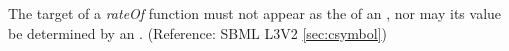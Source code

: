 The target of a \emph{rateOf}  function must not appear as the  of an \AssignmentRule, nor may its value be determined by an \AlgebraicRule.  (Reference: SBML L3V2 \ref{sec:csymbol})
